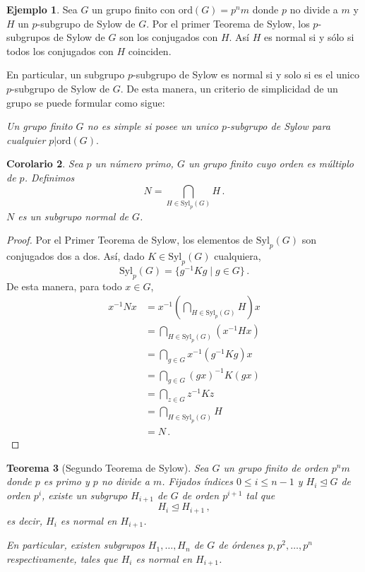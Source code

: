 \documentclass[a4paper,11pt]{amsart}
\theoremstyle{plain}
\newtheorem{thm}{Teorema}[section]
\newtheorem{cor}[thm]{Corolario}
\theoremstyle{definition}
\newtheorem{ej}[thm]{Ejemplo}
\theoremstyle{remark}
\begin{document}
\begin{ej}
Sea $G$ un grupo finito con $\text{ord}(G) = p^n m$ donde $p$ no divide a $m$ y $H$ un $p$-subgrupo de Sylow de $G$. Por el primer Teorema de Sylow, los $p$-subgrupos de Sylow de $G$ son los conjugados con $H$. Así $H$ es normal si y sólo si todos los conjugados con $H$ coinciden.

En particular, un subgrupo $p$-subgrupo de Sylow es normal si y solo si es el unico $p$-subgrupo de Sylow de $G$. De esta manera, un criterio de simplicidad de un grupo se puede formular como sigue: 

\textit{Un grupo finito $G$ no es simple si posee un unico $p$-subgrupo de Sylow para cualquier $p | \text{ord}(G)$}.

\end{ej}

\begin{cor}
Sea $p$ un número primo, $G$ un grupo finito cuyo orden es múltiplo de $p$. Definimos 
$$N = \bigcap_{H \in \text{Syl}_p(G)} H \, . $$
$N$ es un subgrupo normal de $G$.
\end{cor}

\begin{proof}
Por el Primer Teorema de Sylow, los elementos de $\text{Syl}_p(G)$ son conjugados dos a dos. Así, dado $K \in \text{Syl}_p(G)$ cualquiera, 
\[ \text{Syl}_p(G) = \{ g^{-1}Kg \mid g \in G \} \, . \]
De esta manera, para todo $x \in G$, 
\begin{align*}
    x^{-1}N x & = x^{-1}\left( \bigcap_{H \in \text{Syl}_p(G)} H\right) x \\
    & = \bigcap_{H \in \text{Syl}_p(G)} (x^{-1}Hx)\\
    & = \bigcap_{g \in G}x^{-1}(g^{-1}Kg)x \\
    & = \bigcap_{g \in G}(gx)^{-1}K(gx) \\
    & = \bigcap_{z \in G}z^{-1} K z \\
    & = \bigcap_{H \in \text{Syl}_p(G)} H\\
    & = N \, .
\end{align*}
\end{proof}


\begin{thm}[Segundo Teorema de Sylow]
Sea $G$ un grupo finito de orden $p^n m$ donde $p$ es primo y $p$ no divide a $m$. Fijados índices $0 \leq i \leq n-1$ y $H_i \unlhd G$ de orden $p^i$, existe un subgrupo $H_{i+1}$ de $G$ de orden $p^{i+1}$ tal que 
\[ H_i \trianglelefteq H_{i+1} \, , \]
es decir, $H_i$ es normal en $H_{i+1}$. 

En particular, existen subgrupos $H_1, \dots , H_n$ de $G$ de órdenes $p, p^2, \dots , p^n$ respectivamente, tales que $H_i$ es normal en $H_{i+1}$. 
\end{thm}
\end{document}
